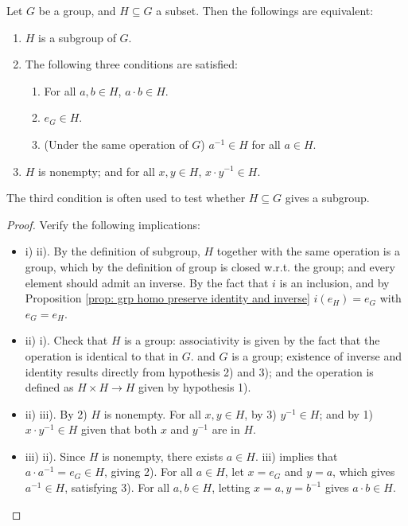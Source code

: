\begin{proposition}\label{prop: subgroup test}
    Let $G$ be a group, and $H \subseteq G$ a subset. Then the followings are equivalent:
    \begin{enumerate}[label=\roman*)]
        \item $H$ is a subgroup of $G$.
        \item The following three conditions are satisfied:
        \begin{enumerate}[label=\arabic*)]
            \item For all $a, b \in H$, $a \cdot b \in H$.
            \item $e_G \in H$.
            \item (Under the same operation of $G$) $a^{-1} \in H$ for all $a \in H$. 
        \end{enumerate}
        \item $H$ is nonempty; and for all $x, y \in H$, $x \cdot y^{-1} \in H$.
    \end{enumerate}
    The third condition is often used to test whether $H \subseteq G$ gives a subgroup. 
\end{proposition}

\begin{proof}
    Verify the following implications:
    \begin{itemize}
        \item i) \implies ii). By the definition of subgroup, $H$ together with the same operation is a group, which by the definition of group is closed w.r.t. the group; and every element should admit an inverse. By the fact that $i$ is an inclusion, and by Proposition \ref{prop: grp homo preserve identity and inverse} $i(e_H) = e_G$ with $e_G = e_H$. 
        \item ii) \implies i). Check that $H$ is a group: associativity is given by the fact that the operation is identical to that in $G$. and $G$ is a group; existence of inverse and identity results directly from hypothesis 2) and 3); and the operation is defined as $H \times H \to H$ given by hypothesis 1).  
        \item ii) \implies iii). By 2) $H$ is nonempty. For all $x, y \in H$, by 3) $y^{-1} \in H$; and by 1) $x \cdot y^{-1} \in H$ given that both $x$ and $y^{-1}$ are in $H$. 
        \item iii) \implies ii). Since $H$ is nonempty, there exists $a \in H$. iii) implies that $a \cdot a^{-1} = e_G \in H$, giving 2). For all $a \in H$, let $x = e_G$ and $y = a$, which gives $a^{-1} \in H$, satisfying 3). For all $a, b \in H$, letting $x = a, y = b^{-1}$ gives $a \cdot b \in H$.  
    \end{itemize}
\end{proof}

